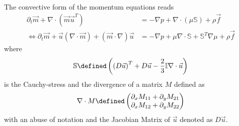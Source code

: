 
The convective form of the momentum equations reads
\begin{equation}
  \label{eq:compressible NS}
  \begin{aligned}
    \partial_t \vec{m} + \nabla \cdot (\vec{m}\vec{u}^T)
    &= - \nabla p + \nabla \cdot (\mu\mathbb{S}) + \rho \vec{f} \\
    \Leftrightarrow\partial_t \vec{m} + \vec{u}(\nabla \cdot \vec{m}) + (\vec{m} \cdot \nabla)\vec{u}
    &= - \nabla p + \mu \nabla \cdot \mathbb{S} + \mathbb{S}^T \nabla\mu + \rho \vec{f}
  \end{aligned}
\end{equation}
where
\begin{equation}
  \mathbb{S} \defined \left({(D\vec{u})}^T + D\vec{u} - \frac{2}{3}\mathbb{I}\nabla\cdot\vec{u} \right)
\end{equation}
is the Cauchy-stress and the divergence of a matrix $M$ defined as
\begin{equation}
  \nabla \cdot M \defined
  \begin{pmatrix}
    \partial_x M_{11} + \partial_y M_{21} \\
    \partial_x M_{12} + \partial_y M_{22}
  \end{pmatrix}
\end{equation}
with an abuse of notation and the Jacobian Matrix of $\vec{u}$ denoted as $D\vec{u}$.

